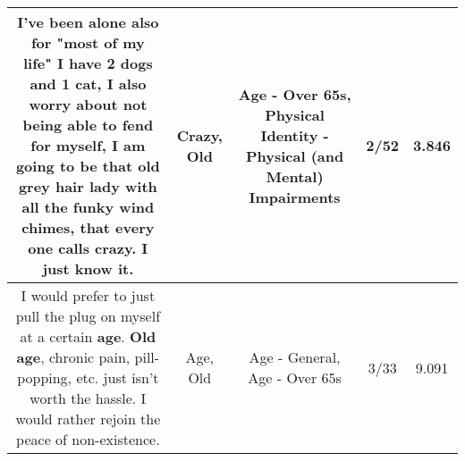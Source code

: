 \documentclass[11pt]{article}
\newlength\mylength
\begin{document}
\begin{center}
\begin{longtable}{|C{.65\mylength}|C{.30\mylength}|C{.12\mylength}|C{.12\mylength}|C{.12\mylength}|}
  \small I've been alone also for "most of my life"  I have 2 dogs and 1 cat,  I also worry about not being able to fend for myself, I am going to be that \textbf{old} grey hair lady with all the funky wind chimes, that every one calls \textbf{crazy}. I just know it.\normalsize   & Crazy, Old & Age - Over 65s, Physical Identity - Physical (and Mental) Impairments & 2/52 & 3.846 \\  \hline
  \small I would prefer to just pull the plug on myself at a certain \textbf{age}.  \textbf{Old} \textbf{age}, chronic pain, pill-popping, etc. just isn't worth the hassle.  I would rather rejoin the peace of non-existence.\normalsize   & Age, Old & Age - General, Age - Over 65s & 3/33 & 9.091 \\  \hline

\end{longtable}
\end{center}
\end{document}
